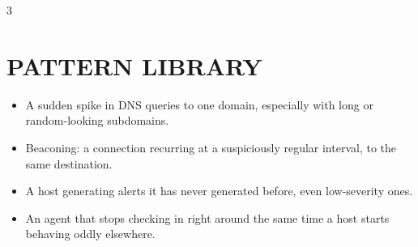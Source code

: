 \documentclass[7pt,landscape]{article}
\begin{document}
\begin{multicols*}{3}
\section{PATTERN LIBRARY}
\begin{itemize}
    \item A sudden spike in DNS queries to one domain, especially with long or random-looking subdomains.
    \item Beaconing: a connection recurring at a suspiciously regular interval, to the same destination.
    \item A host generating alerts it has never generated before, even low-severity ones.
    \item An agent that stops checking in right around the same time a host starts behaving oddly elsewhere.
\end{itemize}

\end{multicols*}
\end{document}
